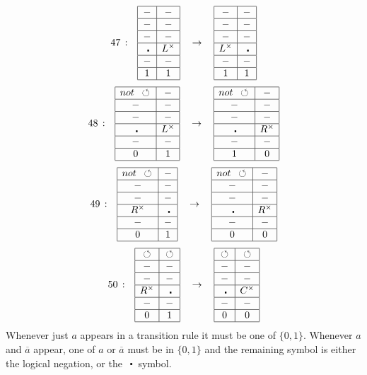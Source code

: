 \documentclass[11pt,letterpaper]{article}
\newcommand{\<}{\langle}
\renewcommand{\>}{\rangle}
\newcommand{\tur}{\,\circlearrowleft\,}   %
\newcommand{\bul}{\:\:\centerdot\:}       %
\newcommand{\goes}{\:\rightarrow\:}		%
\newcommand{\twelve}[6]{ 		%
	\begin{array}{|c|c|}
	\hline #1 & #2 \\
	\hline - & - \\
	\hline - & - \\
	\hline #3 & #4 \\
	\hline - & - \\
	\hline #5 & #6 \\
	\hline
	\end{array}}
\begin{document}
\begin{eqnarray}
	\begin{array}{rccccrccc}
	47\,:& 
		\twelve{-}{-}{\bul}{L^{\times}}{1}{1}
		&\goes&
		\twelve{-}{-}{L^{\times}}{\bul}{1}{1}
	\end{array}	\label{rule17}
\end{eqnarray}
\begin{eqnarray}
	\begin{array}{rccccrccc}
	48\,:& 
		\twelve{not~\tur}{-}{\bul}{L^{\times}}{0}{1}
		&\goes&
		\twelve{not~\tur}{-}{\bul}{R^{\times}}{1}{0}
	\end{array}	\label{rule18}
\end{eqnarray}
\begin{eqnarray}
	\begin{array}{rccccrccc}
	49\,:& 
		\twelve{not~\tur}{-}{R^{\times}}{\bul}{0}{1}
		&\goes&
		\twelve{not~\tur}{-}{\bul}{R^{\times}}{0}{0}
	\end{array}	\label{rule21}
\end{eqnarray}
\begin{eqnarray}
	\begin{array}{rccccrccc}
	50\,:& 
		\twelve{\tur}{\tur}{R^{\times}}{\bul}{0}{1}
		&\goes&
		\twelve{\tur}{\tur}{\bul}{C^{\times}}{0}{0}
	\end{array}	\label{rule22}
\end{eqnarray}
Whenever just $a$ appears in a transition rule it must be one of $\{0,1\}$. Whenever $a$ and $\overline{a}$ appear, one of $a$ or $\overline{a}$ must be in $\{0,1\}$ and the remaining symbol is either the logical negation, or the $\bul$ symbol.
\end{document}
